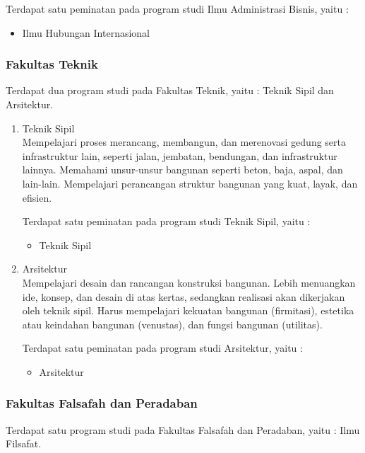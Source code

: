 \begin{enumerate}
			Terdapat satu peminatan pada program studi Ilmu Administrasi Bisnis, yaitu :
			
			\begin{itemize}
				\item Ilmu Hubungan Internasional
			\end{itemize}\leavevmode

	\end{enumerate}\leavevmode
	
\subsubsection{Fakultas Teknik}
Terdapat dua program studi pada Fakultas Teknik, yaitu : Teknik Sipil dan Arsitektur.
	\begin{enumerate}
		\item Teknik Sipil\\
			 Mempelajari proses merancang, membangun, dan merenovasi gedung serta infrastruktur lain, seperti jalan, jembatan, bendungan, dan infrastruktur lainnya. Memahami unsur-unsur bangunan seperti beton, baja, aspal, dan lain-lain. Mempelajari perancangan struktur bangunan yang kuat, layak, dan efisien.
			
			Terdapat satu peminatan pada program studi Teknik Sipil, yaitu :
			
			\begin{itemize}
				\item Teknik Sipil
			\end{itemize}\leavevmode
			
		\item Arsitektur\\
			Mempelajari desain dan rancangan konstruksi bangunan. Lebih menuangkan ide, konsep, dan desain di atas kertas, sedangkan realisasi akan dikerjakan oleh teknik sipil. Harus mempelajari kekuatan bangunan (firmitasi), estetika atau keindahan bangunan (venustas), dan fungsi bangunan (utilitas).
			
			Terdapat satu peminatan pada program studi Arsitektur, yaitu :
			
			\begin{itemize}
				\item Arsitektur
			\end{itemize}\leavevmode

	\end{enumerate}\leavevmode
	
\subsubsection{Fakultas Falsafah dan Peradaban}
Terdapat satu program studi pada Fakultas Falsafah dan Peradaban, yaitu : Ilmu Filsafat.
	
